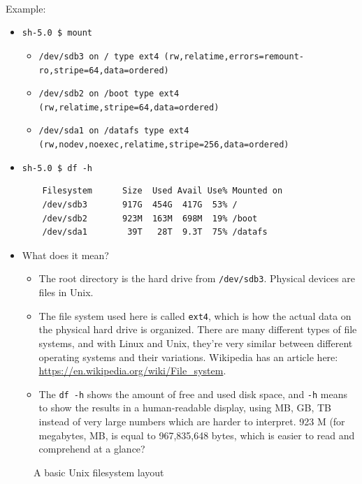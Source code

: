 \documentclass[letter,11pt]{article}
\begin{document}
\paragraph{}Example:
\begin{itemize}
    \item \texttt{sh-5.0 \$ mount}
    \begin{itemize}
        \item \texttt{/dev/sdb3 on / type ext4 (rw,relatime,errors=remount-ro,stripe=64,data=ordered)
}
        \item \texttt{/dev/sdb2 on /boot type ext4 (rw,relatime,stripe=64,data=ordered)}
        \item \texttt{/dev/sda1 on /datafs type ext4 (rw,nodev,noexec,relatime,stripe=256,data=ordered)}
    \end{itemize}
    \item \texttt{sh-5.0 \$ df -h}
    \begin{verbatim}
    Filesystem      Size  Used Avail Use% Mounted on
    /dev/sdb3       917G  454G  417G  53% /
    /dev/sdb2       923M  163M  698M  19% /boot
    /dev/sda1        39T   28T  9.3T  75% /datafs
    \end{verbatim}
    \item What does it mean?
    \begin{itemize}
        \item The root directory is the hard drive from \texttt{/dev/sdb3}. Physical devices are files in Unix.
        \item The file system used here is called \texttt{ext4}, which is how the actual data on the physical hard drive is organized. There are many different types of file systems, and with Linux and Unix, they're very similar between different operating systems and their variations. Wikipedia has an article here: \url{https://en.wikipedia.org/wiki/File_system}.
        \item The \texttt{df -h} shows the amount of free and used disk space, and \texttt{-h} means to show the results in a human-readable display, using MB, GB, TB instead of very large numbers which are harder to interpret. 923 M (for megabytes, MB, is equal to 967,835,648 bytes, which is easier to read and comprehend at a glance?
    \end{itemize}
\end{itemize}

\FloatBarrier
\begin{figure}

\caption{A basic Unix filesystem layout}
\label{fig:unixfs}
\end{figure}
\end{document}
